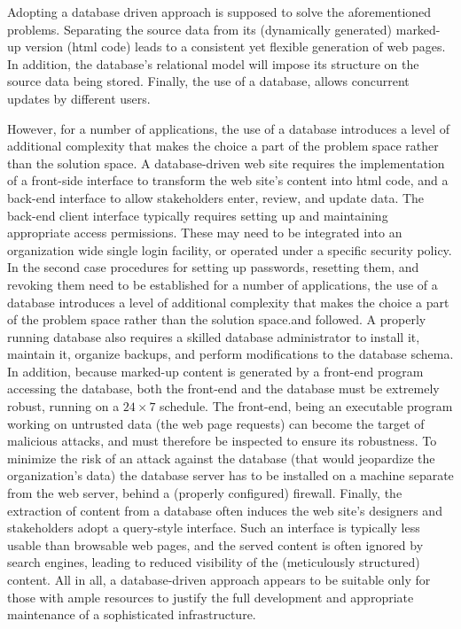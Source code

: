 \documentclass[10pt]{article}
\begin{document}
Adopting a database driven approach is supposed to
solve the aforementioned problems.
Separating the source data from its (dynamically generated)
marked-up version ({\sc html } code) leads to a consistent
yet flexible generation of web pages.
In addition, the database's relational model will impose
its structure on the source data being stored.
Finally, the use of a database, allows concurrent updates by
different users.

However, for a number of applications, the use of a database
introduces a level of additional complexity that
makes the choice a part of
the problem space rather than the solution space.
A database-driven web site requires the implementation of a
front-side interface to transform the web site's content into
{\sc html} code, and a back-end interface to allow stakeholders
enter, review, and update data.
The back-end client interface typically requires setting up
and maintaining appropriate access permissions.
These may need to be integrated into an organization wide single
login facility, or operated under a specific security policy.
In the second case procedures for setting up passwords,
resetting them, and revoking them need to be established
 for a number of applications, the use of a database
introduces a level of additional complexity that
makes the choice a part of
the problem space rather than the solution space.and followed.
A properly running database also requires a skilled database
administrator to install it, maintain it, organize backups,
and perform modifications to the database schema.
In addition, because marked-up content is generated by a front-end
program accessing the database, both the front-end and the database
must be extremely robust, running on a $24 \times 7$ schedule.
The front-end, being an executable program working on
untrusted data (the web page requests) can become the target of
malicious attacks,
and must therefore be inspected to ensure its robustness.
To minimize the risk of an attack against the database
(that would jeopardize the organization's data)
the database server has to be installed on a machine separate
from the web server, behind a (properly configured) firewall.
Finally, the extraction of content from a database often
induces the web site's designers and stakeholders adopt a
query-style interface.
Such an interface is typically less usable than browsable web pages,
and the served content is often ignored by search engines,
leading to reduced visibility
of the (meticulously structured) content.
All in all, a database-driven approach appears to be suitable
only for those with ample resources to justify the full
development and appropriate maintenance of a sophisticated infrastructure.
\end{document}
